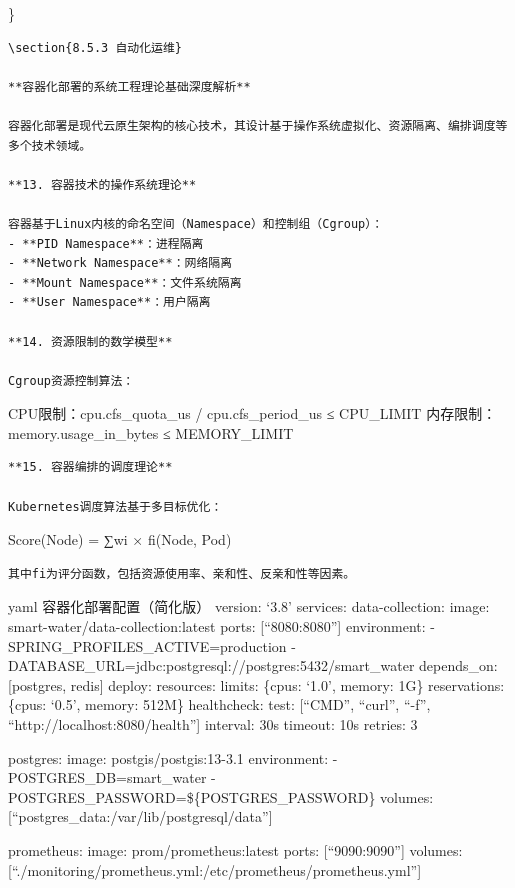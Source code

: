 \}

\begin{lstlisting}
\section{8.5.3 自动化运维}

**容器化部署的系统工程理论基础深度解析**

容器化部署是现代云原生架构的核心技术，其设计基于操作系统虚拟化、资源隔离、编排调度等多个技术领域。

**13. 容器技术的操作系统理论**

容器基于Linux内核的命名空间（Namespace）和控制组（Cgroup）：
- **PID Namespace**：进程隔离
- **Network Namespace**：网络隔离
- **Mount Namespace**：文件系统隔离
- **User Namespace**：用户隔离

**14. 资源限制的数学模型**

Cgroup资源控制算法：
\end{lstlisting}

CPU限制：cpu.cfs\_quota\_us / cpu.cfs\_period\_us ≤ CPU\_LIMIT 内存限制：memory.usage\_in\_bytes ≤ MEMORY\_LIMIT

\begin{lstlisting}
**15. 容器编排的调度理论**

Kubernetes调度算法基于多目标优化：
\end{lstlisting}

Score(Node) = ∑wi × fi(Node, Pod)

\begin{lstlisting}
其中fi为评分函数，包括资源使用率、亲和性、反亲和性等因素。
\end{lstlisting}

yaml  容器化部署配置（简化版） version: `3.8' services: data-collection: image: smart-water/data-collection:latest ports: {[}``8080:8080''{]} environment: - SPRING\_PROFILES\_ACTIVE=production - DATABASE\_URL=jdbc:postgresql://postgres:5432/smart\_water depends\_on: {[}postgres, redis{]} deploy: resources: limits: \{cpus: `1.0', memory: 1G\} reservations: \{cpus: `0.5', memory: 512M\} healthcheck: test: {[}``CMD'', ``curl'', ``-f'', ``http://localhost:8080/health''{]} interval: 30s timeout: 10s retries: 3

postgres: image: postgis/postgis:13-3.1 environment: - POSTGRES\_DB=smart\_water - POSTGRES\_PASSWORD=\$\{POSTGRES\_PASSWORD\} volumes: {[}``postgres\_data:/var/lib/postgresql/data''{]}

prometheus: image: prom/prometheus:latest ports: {[}``9090:9090''{]} volumes: {[}``./monitoring/prometheus.yml:/etc/prometheus/prometheus.yml''{]}


